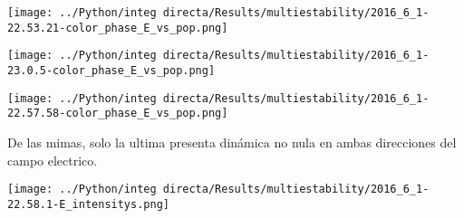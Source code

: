 		\begin{minipage}{0.33\textwidth}
			\centering
			\texttt{[image: ../Python/integ directa/Results/multiestability/2016\_6\_1-22.53.21-color\_phase\_E\_vs\_pop.png]}
			
		\end{minipage}
		\begin{minipage}{0.33\textwidth}
			
			\centering
			\texttt{[image: ../Python/integ directa/Results/multiestability/2016\_6\_1-23.0.5-color\_phase\_E\_vs\_pop.png]}
			
		\end{minipage}
		\begin{minipage}{0.33\textwidth}
			
			\centering
			\texttt{[image: ../Python/integ directa/Results/multiestability/2016\_6\_1-22.57.58-color\_phase\_E\_vs\_pop.png]}
			
		\end{minipage}
		
		
		De las mimas, solo la ultima presenta dinámica no nula en ambas direcciones del campo electrico.
		
		\begin{minipage}{0.5\textwidth}
			
			\centering
			\texttt{[image: ../Python/integ directa/Results/multiestability/2016\_6\_1-22.58.1-E\_intensitys.png]}
			
		\end{minipage}
